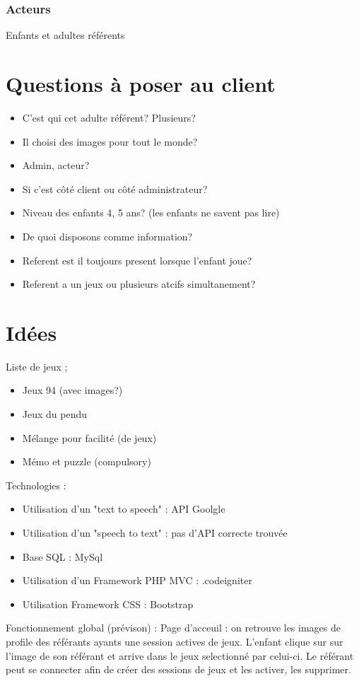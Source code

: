 \documentclass[12pt,a4paper]{report}
\begin{document}
\subsection{Acteurs}
Enfants et adultes référents
\chapter{Questions à poser au client}
\begin{itemize}
\item C'est qui cet adulte référent? Plusieurs?
\item Il choisi des images pour tout le monde?
\item Admin, acteur?
\item Si c'est côté client ou côté administrateur?
\item Niveau des enfants 4, 5 ans? (les enfants ne savent pas lire)
\item De quoi disposons comme information?
\item Referent est il toujours present lorsque l'enfant joue?
\item Referent a un jeux ou plusieurs atcifs simultanement?
\end{itemize}
\chapter{Idées}
Liste de jeux ;
\begin{itemize}
\item Jeux 94 (avec images?)
\item Jeux du pendu
\item Mélange pour facilité (de jeux)
\item Mémo et puzzle (compulsory)
\end{itemize}
Technologies :
\begin{itemize}
\item Utilisation d'un "text to speech" : API Goolgle
\item Utilisation d'un "speech to text" : pas d'API correcte trouvée
\item Base SQL : MySql
\item Utilisation d'un Framework PHP MVC : .codeigniter
\item Utilisation Framework CSS : Bootstrap
\end{itemize}
Fonctionnement global (prévison) :
Page d'acceuil : on retrouve les images de profile des référants ayants une session actives de jeux.
L'enfant clique sur sur l'image de son référant et arrive dans le jeux selectionné par celui-ci.
Le référant peut se connecter afin de créer des sessions de jeux et les activer, les supprimer.
\end{document}
